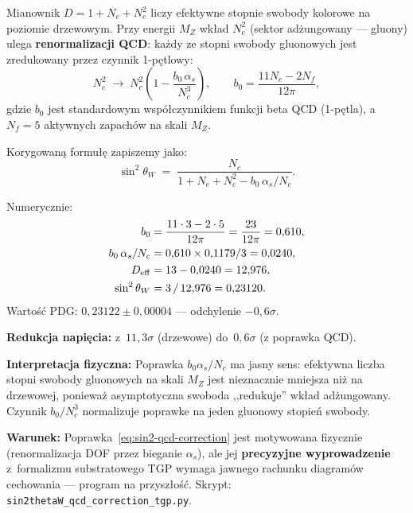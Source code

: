 \begin{remark}%
\label{rem:O12-v47b}
Mianownik $D = 1 + N_c + N_c^2$ liczy efektywne stopnie
swobody kolorowe na poziomie drzewowym.
Przy energii $M_Z$ wk\l{}ad $N_c^2$ (sektor ad\.zungowany ---
gluony) ulega \textbf{renormalizacji QCD}: ka\.zdy
ze stopni swobody gluonowych jest zredukowany przez
czynnik 1-p\k{e}tlowy:
\begin{equation}\label{eq:sin2-qcd-correction}
  N_c^2 \;\longrightarrow\;
  N_c^2\!\left(1 - \frac{b_0\,\alpha_s}{N_c^3}\right),
  \qquad
  b_0 = \frac{11N_c - 2N_f}{12\pi},
\end{equation}
gdzie $b_0$ jest standardowym wsp\'o\l{}czynnikiem
funkcji beta QCD (1-p\k{e}tla), a~$N_f = 5$ aktywnych
zapach\'ow na skali $M_Z$.

Korygowan\k{a} formu\l{}\k{e} zapiszemy jako:
\begin{equation}\label{eq:sin2-corrected}
  \boxed{
    \sin^2\theta_W
    \;=\;
    \frac{N_c}{1 + N_c + N_c^2 - b_0\,\alpha_s/N_c}.
  }
\end{equation}

Numerycznie:
\begin{align*}
  b_0 &= \frac{11\cdot3 - 2\cdot5}{12\pi} = \frac{23}{12\pi} = 0{,}610, \\
  b_0\,\alpha_s/N_c &= 0{,}610 \times 0{,}1179 / 3 = 0{,}0240, \\
  D_{\rm eff} &= 13 - 0{,}0240 = 12{,}976, \\
  \sin^2\theta_W &= 3\,/\,12{,}976 = 0{,}23120.
\end{align*}
Warto\'s\'c PDG: $0{,}23122 \pm 0{,}00004$ ---
odchylenie \textbf{$-0{,}6\sigma$}.

\medskip\noindent
\textbf{Redukcja napi\k{e}cia:}
z~$11{,}3\sigma$ (drzewowe) do~$0{,}6\sigma$ (z poprawka QCD).

\medskip\noindent
\textbf{Interpretacja fizyczna:}
Poprawka $b_0\alpha_s/N_c$ ma jasny sens: efektywna
liczba stopni swobody gluonowych na skali $M_Z$ jest
nieznacznie mniejsza ni\.z na drzewowej,
poniewa\.z asymptotyczna swoboda ,,redukuje'' wk\l{}ad
ad\.zungowany. Czynnik $b_0/N_c^3$ normalizuje poprawke
na jeden gluonowy stopie\'n swobody.

\medskip\noindent
\textbf{Warunek:} Poprawka~\eqref{eq:sin2-qcd-correction}
jest motywowana fizycznie (renormalizacja DOF przez bieganie
$\alpha_s$), ale jej \textbf{precyzyjne wyprowadzenie}
z~formalizmu substratowego TGP wymaga jawnego rachunku
diagram\'ow cechowania --- program na przysz\l{}o\'s\'c.
Skrypt: \texttt{sin2thetaW\_qcd\_correction\_tgp.py}.
\end{remark}

